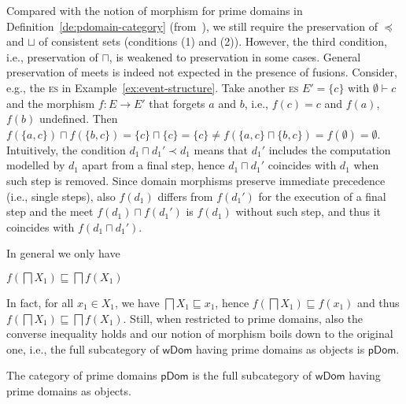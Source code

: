 \documentclass[conference]{IEEEtran}
\newcommand{\esabbr}{\textsc{es}}
\newcommand{\WDom}{\ensuremath{\mathsf{wDom}}}
\newcommand{\PDom}{\ensuremath{\mathsf{pDom}}}
\begin{document}
Compared with the notion of morphism for prime domains in
Definition~\ref{de:pdomain-category} (from~\cite{Win:ES}), we still
require the preservation of $\preceq$ and $\sqcup$ of consistent sets
(conditions (1) and (2)). However, the third condition, i.e.,
preservation of $\sqcap$, is weakened to preservation in some
cases. General preservation of meets is indeed not expected in the
presence of fusions. Consider, e.g., the {\esabbr} in
Example~\ref{ex:event-structure}. Take another {\esabbr} $E' = \{c \}$
with $\emptyset \vdash c$ and the morphism $f : E \to E'$ that forgets
$a$ and $b$, i.e., $f(c) = c$ and $f(a)$, $f(b)$ undefined.
%
Then $f(\{a,c\}) \sqcap f(\{b,c\}) = \{c\} \sqcap \{c\} = \{ c \} \neq
f(\{a,c\} \sqcap \{b,c\}) = f(\emptyset) = \emptyset$. 
%
Intuitively, the condition $d_1 \sqcap d_1' \prec d_1$ means that
$d_1'$ includes the computation modelled by $d_1$ apart from a final
step, hence $d_1 \sqcap d_1'$ coincides with $d_1$ when such step is
removed. Since domain morphisms preserve immediate precedence (i.e.,
single steps), also $f(d_1)$ differs from $f(d_1')$ for the
execution of a final step and the meet $f(d_1) \sqcap f(d_1')$ is
$f(d_1)$ without such step, and thus it coincides with
$f(d_1 \sqcap d_1')$.

In general we only have
\begin{center}
  $f(\bigsqcap X_1) \sqsubseteq \bigsqcap f(X_1)$
\end{center}
% 
In fact, for all $x_1 \in X_1$, we have
$\bigsqcap X_1 \sqsubseteq x_1$, hence
$f(\bigsqcap X_1) \sqsubseteq f(x_1)$ and thus
$f(\bigsqcap X_1) \sqsubseteq \bigsqcap f(X_1)$.
%
Still, when restricted to prime domains, also the converse inequality
holds and our notion of morphism boils down to the original one, i.e.,
the full subcategory of $\WDom$ having prime domains as objects is
$\PDom$.



\begin{theorem}[$\PDom$ as a subcategory of $\WDom$]
    \label{th:PdomFullSub}
  The category of prime domains $\PDom$ is the full
  subcategory of $\WDom$ having prime domains as objects.
\end{theorem}
\end{document}
